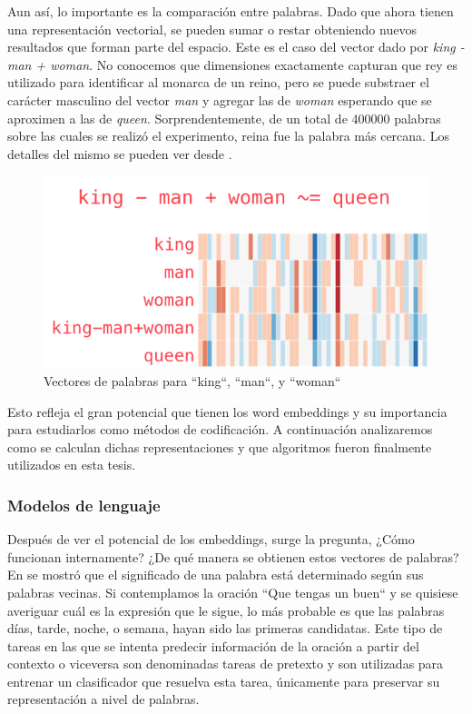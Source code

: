 Aun así, lo importante es la comparación entre palabras. Dado que ahora tienen
una representación vectorial, se pueden sumar o restar obteniendo nuevos
resultados que forman parte del espacio. Este es el caso del vector dado por
\emph{king - man + woman}. No conocemos que dimensiones exactamente capturan que
rey es utilizado para identificar al monarca de un reino, pero se puede
substraer el carácter masculino del vector \emph{man} y agregar las de
\emph{woman} esperando que se aproximen a las de \emph{queen}.
Sorprendentemente, de un total de 400000 palabras sobre las cuales se realizó el
experimento, reina fue la palabra más cercana. Los detalles del mismo se pueden
ver desde \citep{jalammar-website}.

\begin{figure}
    \centering
    \includegraphics[scale=0.68]{figures/king-analogy-viz.png}
    \caption{Vectores de palabras para ``king``, ``man``, y ``woman``}
    \label{fig:king-queen-example}
\end{figure}

Esto refleja el gran potencial que tienen los word embeddings y su importancia
para estudiarlos como métodos de codificación. A continuación analizaremos como
se calculan dichas representaciones y que algoritmos fueron finalmente
utilizados en esta tesis.

\subsubsection{Modelos de lenguaje}

Después de ver el potencial de los embeddings, surge la pregunta, ¿Cómo
funcionan internamente? ¿De qué manera se obtienen estos vectores de palabras?
En \citep{firth-57} se mostró que el significado de una palabra está determinado
según sus palabras vecinas. Si contemplamos la oración ``Que tengas un buen`` y
se quisiese averiguar cuál es la expresión que le sigue, lo más probable es que
las palabras días, tarde, noche, o semana, hayan sido las primeras candidatas.
Este tipo de tareas en las que se intenta predecir información de la oración a
partir del contexto o viceversa son denominadas tareas de pretexto y son
utilizadas para entrenar un clasificador que resuelva esta tarea, únicamente
para preservar su representación a nivel de palabras.

